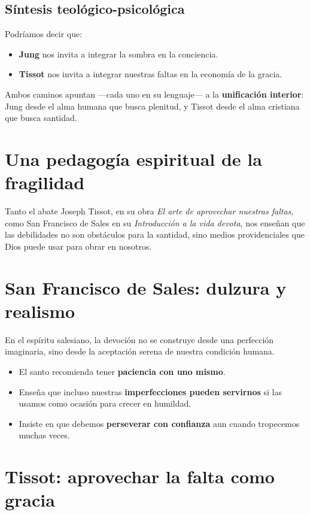 \documentclass[12pt]{article}
\begin{document}
\subsection*{Síntesis teológico-psicológica}

Podríamos decir que:
\begin{itemize}
    \item \textbf{Jung} nos invita a integrar la sombra en la conciencia.
    \item \textbf{Tissot} nos invita a integrar nuestras faltas en la economía de la gracia.
\end{itemize}

Ambos caminos apuntan ---cada uno en su lenguaje--- a la \textbf{unificación interior}: Jung desde el alma humana que busca plenitud, y Tissot desde el alma cristiana que busca santidad.

\section*{Una pedagogía espiritual de la fragilidad}

Tanto el abate Joseph Tissot, en su obra \textit{El arte de aprovechar nuestras faltas}, como San Francisco de Sales en su \textit{Introducción a la vida devota}, nos enseñan que las debilidades no son obstáculos para la santidad, sino medios providenciales que Dios puede usar para obrar en nosotros.

\section*{San Francisco de Sales: dulzura y realismo}

En el espíritu salesiano, la devoción no se construye desde una perfección imaginaria, sino desde la aceptación serena de nuestra condición humana.

\begin{itemize}
    \item El santo recomienda tener \textbf{paciencia con uno mismo}.
    \item Enseña que incluso nuestras \textbf{imperfecciones pueden servirnos} si las usamos como ocasión para crecer en humildad.
    \item Insiste en que debemos \textbf{perseverar con confianza} aun cuando tropecemos muchas veces.
\end{itemize}

\section*{Tissot: aprovechar la falta como gracia}
\end{document}
